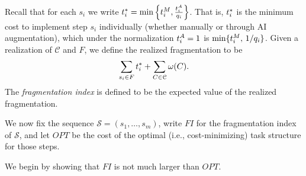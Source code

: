 Recall that for each $s_i$ we write $t^*_{i} = \min\left\{t^{M}_{i}, \frac{t^{A}_{i}}{q_i}\right\}$.
That is, $t^*_{i}$ is the minimum cost to implement step $s_i$ individually (whether manually or through AI augmentation), which under the normalization $t^{A}_{i} = 1$ is $\min\{t^{M}_{i},\, 1/q_i\}$.
Given a realization of $\mathcal{C}$ and $F$, we define the realized fragmentation to be
\[ \sum_{s_i \in F}t^*_{i} + \sum_{C \in \mathcal{C}} \omega(C).\]
The \emph{fragmentation index} is defined to be the expected value of the realized fragmentation.

We now fix the sequence $\mathcal{S} = (s_1, \dotsc, s_m)$, write $FI$ for the fragmentation index of $\mathcal{S}$, and let $OPT$ be the cost of the optimal (i.e., cost-minimizing) task structure for those steps.

We begin by showing that $FI$ is not much larger than $OPT$.

